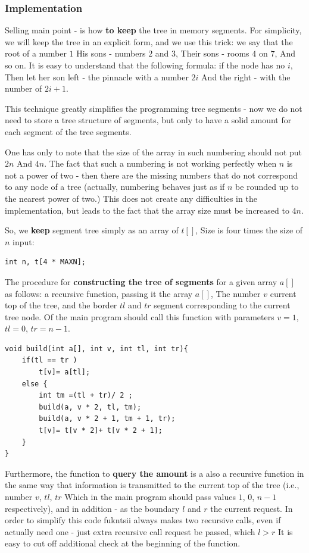 \subsubsection{ Implementation }

Selling main point - is how \textbf{to keep} the tree in memory segments. For simplicity, we will keep the tree in an explicit form, and we use this trick: we say that the root of a number $1$ His sons - numbers $2$ and $3$, Their sons - rooms $4$ on $7$, And so on. It is easy to understand that the following formula: if the node has no $i$, Then let her son left - the pinnacle with a number $2i$ And the right - with the number of $2i +1$.

This technique greatly simplifies the programming tree segments - now we do not need to store a tree structure of segments, but only to have a solid amount for each segment of the tree segments.

One has only to note that the size of the array in such numbering should not put $2n$ And $4n$. The fact that such a numbering is not working perfectly when $n$ is not a power of two - then there are the missing numbers that do not correspond to any node of a tree (actually, numbering behaves just as if $n$ be rounded up to the nearest power of two.) This does not create any difficulties in the implementation, but leads to the fact that the array size must be increased to $4n$.

So, we \textbf{keep} segment tree simply as an array of $t []$, Size is four times the size of $n$ input:

\begin{verbatim}
int n, t[4 * MAXN]; 
\end{verbatim}
The procedure for \textbf{constructing the tree of segments} for a given array $a []$ as follows: a recursive function, passing it the array $a []$, The number $v$ current top of the tree, and the border $tl$ and $tr$ segment corresponding to the current tree node. Of the main program should call this function with parameters $v = 1$, $tl = 0$, $tr = n-1$.

\begin{verbatim}
void build(int a[], int v, int tl, int tr){
    if(tl == tr )
        t[v]= a[tl];
    else {
        int tm =(tl + tr)/ 2 ;
        build(a, v * 2, tl, tm);
        build(a, v * 2 + 1, tm + 1, tr);
        t[v]= t[v * 2]+ t[v * 2 + 1];
    }
} 
\end{verbatim}
Furthermore, the function to \textbf{query the amount} is a also a recursive function in the same way that information is transmitted to the current top of the tree (i.e., number $v$, $tl$, $tr$ Which in the main program should pass values $1$, $0$, $n-1$ respectively), and in addition - as the boundary $l$ and $r$ the current request. In order to simplify this code fukntsii always makes two recursive calls, even if actually need one - just extra recursive call request be passed, which $l> r$ It is easy to cut off additional check at the beginning of the function.

